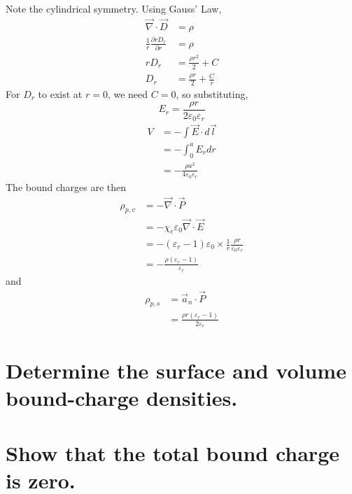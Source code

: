 \documentclass[answers]{exam}
\begin{document}
\begin{questions}
\begin{solution}
	Note the cylindrical symmetry. Using Gauss' Law,
	\begin{align*}
		\vec{\nabla} \cdot \vec{D} &= \rho \\
		\frac{1}{r} \frac{\partial rD_r}{\partial r} &= \rho \\
		rD_r &= \frac{\rho r^2}{2} + C \\
		D_r &= \frac{\rho r}{2} + \frac{C}{r}
	\end{align*}
	For $D_r$ to exist at $r=0$, we need $C=0$, so substituting,
	$$E_r = \frac{\rho r}{2\varepsilon_0\varepsilon_r}$$
	\begin{align*}
		V &= -\int\vec{E}\cdot d\vec{l} \\
		  &= -\int_0^a E_rdr \\
		  &= -\frac{\rho a^2}{4\varepsilon_0\varepsilon_r}
	\end{align*}
	The bound charges are then
	\begin{align*}
		\rho_{p,v} &= -\vec{\nabla}\cdot\vec{P} \\
			   &= -\chi_e\varepsilon_0\vec{\nabla}\cdot\vec{E} \\
			   &= -(\varepsilon_r-1)\varepsilon_0\times\frac{1}{r}\frac{\rho r}{\varepsilon_0\varepsilon_r} \\
			   &= -\frac{\rho(\varepsilon_r-1)}{\varepsilon_r}
	\end{align*}
	and
	\begin{align*}
		\rho_{p,s} &= \vec{a}_n \cdot \vec{P} \\
			   &= \frac{\rho r(\varepsilon_r-1)}{2\varepsilon_r}
	\end{align*}
\end{solution}


\begin{parts}
	\part{Determine the surface and volume bound-charge densities.}
	\part{Show that the total bound charge is zero.}
\end{parts}


\end{questions}
\end{document}
